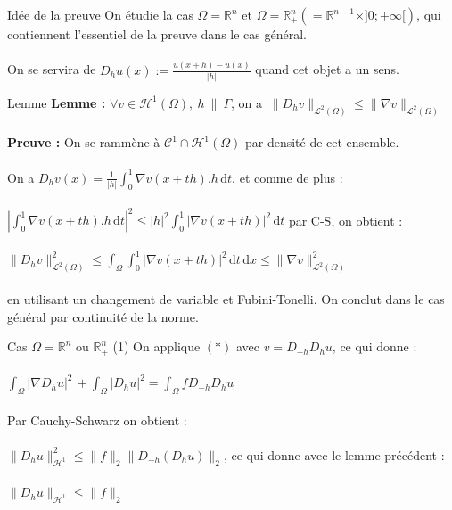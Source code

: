 \documentclass[10pt]{beamer}
\begin{document}
\begin{frame}{Idée de la preuve}
On étudie la cas $\Omega=\mathbb{R}^n$ et  $\Omega=\mathbb{R}^n_+(=\mathbb{R}^{n-1}\times ]0;+\infty[)$, qui contiennent l'essentiel de la preuve dans le cas général. \\ ~ \\ 

On se servira de $\displaystyle D_hu(x):=\frac{u(x+h)-u(x)}{|h|}$ quand cet objet a un sens.

\end{frame}


\begin{frame}{Lemme}
\textbf{Lemme :}
$\forall v \in \mathcal{H}^1(\Omega), \ h \ \| \ \Gamma$, on a $\ \|D_hv\|_{\mathcal{L}^2(\Omega)} \leq \|\nabla v\|_{\mathcal{L}^2(\Omega)}  $ \\~\\

\textbf{Preuve :} On se rammène à $\mathcal{C}^1\cap \mathcal{H}^1(\Omega)$ par densité de cet ensemble. \\~\\
On a $D_hv(x) = \displaystyle \frac{1}{|h|}\int_0^1 \nabla v(x+th).h \,\mathrm{d}t $, et comme de plus : \\~\\

$\displaystyle \left | \int_0^1 \nabla v(x+th).h \,\mathrm{d}t \right |^2 \leq |h|^2 \int_0^1 |\nabla v(x+th)|^2 \,\mathrm{d}t $ par C-S, on obtient : \\~\\

$\|D_hv\|^2_{\mathcal{L}^2(\Omega)} \leq \displaystyle \int_{\Omega} \int_0^1 | \nabla v(x+th)|^2 \,\mathrm{d}t \,\mathrm{d}x \leq \| \nabla v\|^2_{\mathcal{L}^2(\Omega)}$ \\~\\

en utilisant un changement de variable et Fubini-Tonelli. On conclut dans le cas général par continuité de la norme.

\end{frame}


\begin{frame}{Cas $\Omega=\mathbb{R}^n$ ou $\mathbb{R}^n_+$ (1)}
On applique $(*)$ avec $v=D_{-h}D_hu$, ce qui donne  : \\~\\

$ \displaystyle \int_{\Omega} |\nabla D_h u|^2 \,  + \int_{\Omega} |D_hu|^2 =  \int_{\Omega} f D_{-h}D_hu  \,$ \\~\\

Par Cauchy-Schwarz on obtient : \\~\\ 

$\|D_hu\|^2_{\mathcal{H}^1} \leq \|f\|_2 \|D_{-h}(D_hu)\|_2 $, ce qui donne avec le lemme précédent : \\~\\

$\|D_hu\|_{\mathcal{H}^1} \leq \|f\|_2 $
\end{frame}
\end{document}

